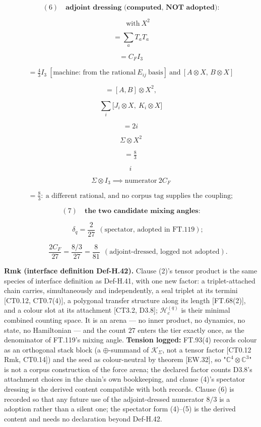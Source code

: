 \begin{theorem}
\[
(6)\quad\textbf{adjoint dressing (computed, NOT adopted):}
\]

\[
\qquad \text{with}\ X^2
\]

\[
= \textstyle\sum_aT_aT_a
\]

\[
= C_FI_3
\]

\[
= \tfrac43I_3\ [\text{machine: from the rational}\ E_{ij}\ \text{basis}]\ \text{and}\ [A\otimes X,\,B\otimes X]
\]

\[
= [A,B]\otimes X^2,
\]

\[
\sum_i\bigl[J_i\otimes X,\ K_i\otimes X\bigr]
\]

\[
= 2i\,
\]

\[
\Sigma\otimes X^2
\]

\[
= \tfrac83\,
\]

\[
i\,
\]

\[
\Sigma\otimes I_3\implies\text{numerator}\ 2C_F
\]

\[
= \tfrac83:\ \text{a different rational, and no corpus tag supplies the coupling};
\]

\[
(7)\quad\textbf{the two candidate mixing angles:}
\]

\[
\qquad \delta_q=\frac{2}{27}\ \ (\text{spectator, adopted in FT.119});
\]

\[
\qquad \frac{2C_F}{27}=\frac{8/3}{27}=\frac8{81}\ \ (\text{adjoint-dressed, logged not adopted}).
\]

\textbf{Rmk (interface definition Def-H.42).} Clause (2)'s tensor product is the same species of interface definition as Def-H.41, with one new factor: a triplet-attached chain carries, simultaneously and independently, a seal triplet at its termini [CT0.12, CT0.7(4)], a polygonal transfer structure along its length [FT.68(2)], and a colour slot at its attachment [CT3.2, D3.8]; $\mathcal H_c^{(q)}$ is their minimal combined counting space. It is an arena — no inner product, no dynamics, no state, no Hamiltonian — and the count $27$ enters the tier exactly once, as the denominator of FT.119's mixing angle. \textbf{Tension logged:} FT.93(4) records colour as an orthogonal stack block (a $\oplus$-summand of $\mathcal K_\Sigma$, not a tensor factor [CT0.12 Rmk, CT0.14]) and the seed as colour-neutral by theorem [EW.32], so "$\mathbb C^4\otimes\mathbb C^3$" is not a corpus construction of the force arena; the declared factor counts D3.8's attachment choices in the chain's own bookkeeping, and clause (4)'s spectator dressing is the derived content compatible with both records. Clause (6) is recorded so that any future use of the adjoint-dressed numerator $8/3$ is a adoption rather than a silent one; the spectator form (4)–(5) is the derived content and needs no declaration beyond Def-H.42.


\end{theorem}
